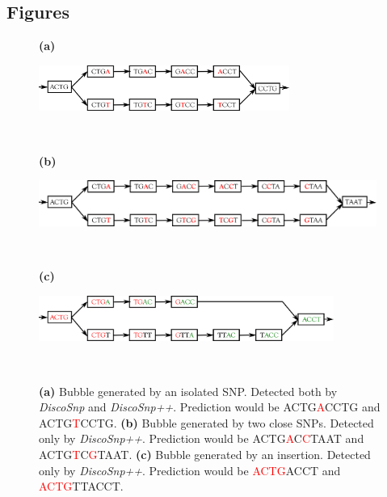 \documentclass{bmcart}
\newcommand{\disco}{{\it DiscoSnp}\xspace}
\newcommand{\discopp}{{\it DiscoSnp++}\xspace}
\begin{document}
\begin{backmatter}

\section*{Figures}

\begin{figure}[h!]  
\begin{minipage}[c]{0.05\textwidth}
\textbf{(a)}
\end{minipage}
\begin{minipage}[c]{0.90\textwidth}
\includegraphics[height=1.5cm]{figures/bubble_snp.png}
\end{minipage}\\

\begin{minipage}[c]{0.05\textwidth}
\textbf{(b)}
\end{minipage}
\begin{minipage}[c]{0.9\textwidth}
\includegraphics[height=1.5cm]{figures/bubble_close_snp.png}
\end{minipage}\\


\begin{minipage}[c]{0.05\textwidth}
\textbf{(c)}
\end{minipage}
\begin{minipage}[c]{0.9\textwidth}
\includegraphics[height=1.5cm]{figures/bubble_indel.png}
\end{minipage}\\

	
\caption{ \textbf{(a)} Bubble generated by an isolated SNP. Detected both by \disco and  \discopp. Prediction would be ACTG\textcolor{red}{A}CCTG and ACTG\textcolor{red}{T}CCTG. \textbf{(b)} Bubble generated by two close SNPs. Detected only by \discopp. Prediction would be ACTG\textcolor{red}{A}C\textcolor{red}{C}TAAT and ACTG\textcolor{red}{T}C\textcolor{red}{G}TAAT. \textbf{(c)} Bubble generated by an insertion. Detected only by \discopp. Prediction would be \textcolor{red}{ACTG}\textcolor{my_green}{ACCT} and \textcolor{red}{ACTG}TT\textcolor{my_green}{ACCT}. }
\label{fig:basical_bubble}
\end{figure}


\end{backmatter}
\end{document}
